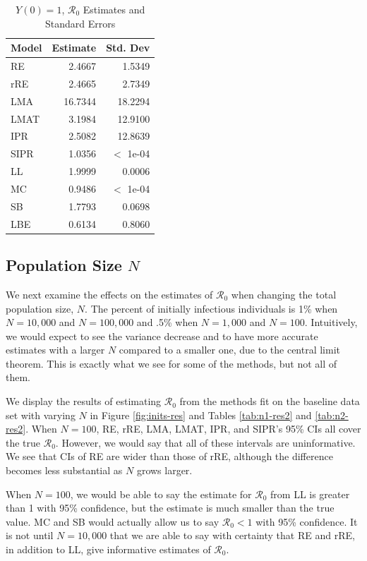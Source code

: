 \documentclass[12pt]{article}
\newcommand{\rr}{\ensuremath{\mathcal{R}_0}}
\begin{document}
\begin{table}[H]
	
	\centering
	\begin{tabular}[t]{l|r|r}
		\hline
		Model & Estimate & Std. Dev\\
		\hline
		RE & 2.4667 & 1.5349\\
		\hline
		rRE & 2.4665 & 2.7349\\
		\hline
		LMA & 16.7344 & 18.2294\\
		\hline
		LMAT & 3.1984 & 12.9100\\
		\hline
		IPR & 2.5082 & 12.8639\\
		\hline
		SIPR & 1.0356 & $<$ 1e-04\\
		\hline
		LL & 1.9999 & 0.0006\\
		\hline
		MC & 0.9486 & $<$ 1e-04\\
		\hline
		SB & 1.7793 & 0.0698\\
		\hline
		LBE & 0.6134 & 0.8060\\
		\hline
	\end{tabular}
	\caption{$Y(0) = 1$, $\rr$ Estimates and Standard Errors}
\end{table}


\subsection{Population Size $N$}\label{sec:res-n}
We next examine the effects on the estimates of $\rr$ when changing the total population size, $N$.  The percent of initially infectious individuals is 1\% when $N=10,000$ and $N=100,000$ and .5\% when $N=1,000$ and $N=100$. Intuitively, we would expect to see the variance decrease and to have more accurate estimates with a larger $N$ compared to a smaller one, due to the central limit theorem.  This is exactly what we see for some of the methods, but not all of them.

We display the results of estimating $\rr$ from the methods fit on the baseline data set with varying $N$ in Figure \ref{fig:inits-res} and Tables \ref{tab:n1-res2} and \ref{tab:n2-res2}.  When $N=100$, RE, rRE, LMA, LMAT, IPR, and SIPR's 95\% CIs all cover the true $\rr$.  However, we would say that all of these intervals are uninformative.  We see that CIs of RE are wider than those of rRE, although the difference becomes less substantial as $N$ grows larger.

When $N=100$, we would be able to say the estimate for $\rr$ from LL is greater than 1 with 95\% confidence, but the estimate is much smaller than the true value.  MC and SB would actually allow us to say $\rr < 1$ with 95\% confidence.  It is not until $N=10,000$ that we are able to say with certainty that RE and rRE, in addition to LL, give informative estimates of $\rr$.
\end{document}
